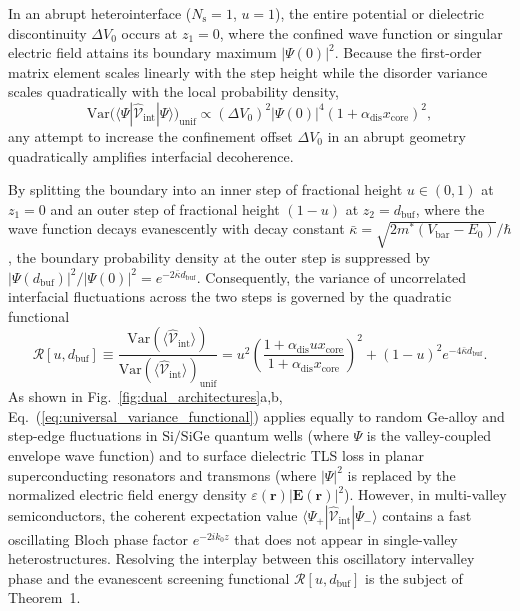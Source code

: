 \documentclass[11pt,letterpaper]{article}
\theoremstyle{definition}
\begin{document}
In an abrupt heterointerface ($N_{\mathrm{s}} = 1$, $u = 1$), the entire potential or dielectric discontinuity $\Delta V_0$ occurs at $z_1 = 0$, where the confined wave function or singular electric field attains its boundary maximum $|\Psi(0)|^2$. Because the first-order matrix element scales linearly with the step height while the disorder variance scales quadratically with the local probability density,
\begin{equation}
  \mathrm{Var}\bigl(\langle \Psi | \hat{\mathcal{V}}_{\mathrm{int}} | \Psi \rangle\bigr)_{\mathrm{unif}} \propto (\Delta V_0)^2 |\Psi(0)|^4 (1 + \alpha_{\mathrm{dis}} x_{\mathrm{core}})^2,
  \label{eq:abrupt_variance_scaling}
\end{equation}
any attempt to increase the confinement offset $\Delta V_0$ in an abrupt geometry quadratically amplifies interfacial decoherence.

By splitting the boundary into an inner step of fractional height $u \in (0,1)$ at $z_1 = 0$ and an outer step of fractional height $(1-u)$ at $z_2 = d_{\mathrm{buf}}$, where the wave function decays evanescently with decay constant $\bar{\kappa} = \sqrt{2m^*(V_{\mathrm{bar}} - E_0)}/\hbar$, the boundary probability density at the outer step is suppressed by $|\Psi(d_{\mathrm{buf}})|^2 / |\Psi(0)|^2 = e^{-2\bar{\kappa} d_{\mathrm{buf}}}$. Consequently, the variance of uncorrelated interfacial fluctuations across the two steps is governed by the quadratic functional
\begin{equation}
  \mathcal{R}[u, d_{\mathrm{buf}}] \equiv \frac{\mathrm{Var}(\langle\hat{\mathcal{V}}_{\mathrm{int}}\rangle)}{\mathrm{Var}(\langle\hat{\mathcal{V}}_{\mathrm{int}}\rangle)_{\mathrm{unif}}} = u^2 \left(\frac{1 + \alpha_{\mathrm{dis}} u x_{\mathrm{core}}}{1 + \alpha_{\mathrm{dis}} x_{\mathrm{core}}}\right)^2 + (1 - u)^2 e^{-4\bar{\kappa} d_{\mathrm{buf}}}.
  \label{eq:universal_variance_functional}
\end{equation}
As shown in Fig.~\ref{fig:dual_architectures}a,b, Eq.~(\ref{eq:universal_variance_functional}) applies equally to random Ge-alloy and step-edge fluctuations in $\mathrm{Si/SiGe}$ quantum wells (where $\Psi$ is the valley-coupled envelope wave function) and to surface dielectric TLS loss in planar superconducting resonators and transmons (where $|\Psi|^2$ is replaced by the normalized electric field energy density $\varepsilon(\mathbf{r})|\mathbf{E}(\mathbf{r})|^2$). However, in multi-valley semiconductors, the coherent expectation value $\langle \Psi_+ | \hat{\mathcal{V}}_{\mathrm{int}} | \Psi_- \rangle$ contains a fast oscillating Bloch phase factor $e^{-2i k_0 z}$ that does not appear in single-valley heterostructures. Resolving the interplay between this oscillatory intervalley phase and the evanescent screening functional $\mathcal{R}[u, d_{\mathrm{buf}}]$ is the subject of Theorem~1.
\end{document}
